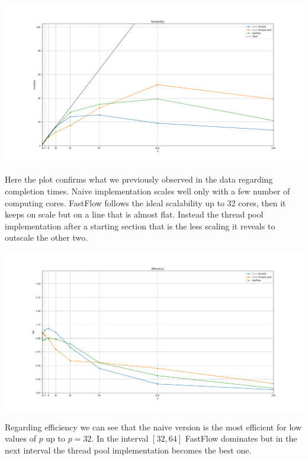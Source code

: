 \documentclass[11pt]{article}
\begin{document}
\begin{center}
	\begin{minipage}{\linewidth}
		\includegraphics[width=\linewidth]{plots/SCALAB-10-1024-10000.png}
	\end{minipage}
\end{center}
Here the plot confirms what we previously observed in the data regarding completion times.
Naive implementation scales well only with a few number of computing cores. FastFlow follows the ideal scalability up to 32 cores, then it keeps on scale but on a line that is almost flat. Instead the thread pool implementation after a starting section that is the less scaling it reveals to outscale the other two.


\begin{center}
	\begin{minipage}{\linewidth}
		\includegraphics[width=\linewidth]{plots/EFFI-10-1024-10000.png}
	\end{minipage}
\end{center}
Regarding efficiency we can see that the naive version is the most efficient for low values of $ p $ up to $ p=32 $. In the interval $ [32, 64] $ FastFlow dominates but in the next interval the thread pool implementation becomes the best one.

\begin{center}

\end{center}

\begin{center}

\end{center}
\end{document}
